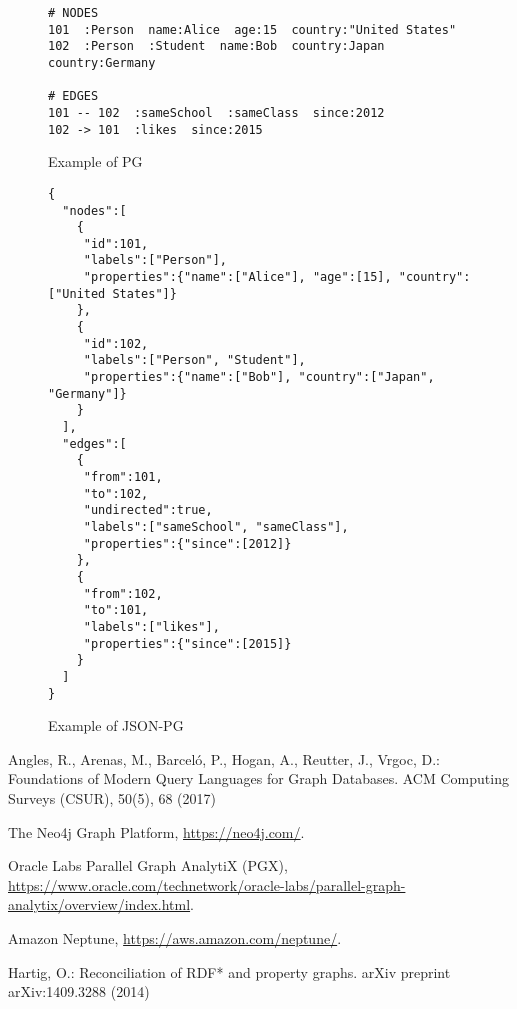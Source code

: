 \documentclass[runningheads]{llncs}
\begin{document}
\begin{figure}[!t]
\begin{scriptsize}
\begin{verbatim}
# NODES
101  :Person  name:Alice  age:15  country:"United States"
102  :Person  :Student  name:Bob  country:Japan  country:Germany

# EDGES
101 -- 102  :sameSchool  :sameClass  since:2012
102 -> 101  :likes  since:2015
\end{verbatim}
\end{scriptsize}
\caption{Example of PG}
\label{fig:example-pg}
\end{figure}

\begin{figure}[!t]
\begin{scriptsize}
\begin{verbatim}
{
  "nodes":[
    {
     "id":101,
     "labels":["Person"],
     "properties":{"name":["Alice"], "age":[15], "country":["United States"]}
    },
    {
     "id":102,
     "labels":["Person", "Student"],
     "properties":{"name":["Bob"], "country":["Japan", "Germany"]}
    }
  ],
  "edges":[
    {
     "from":101,
     "to":102,
     "undirected":true,
     "labels":["sameSchool", "sameClass"],
     "properties":{"since":[2012]}
    },
    {
     "from":102,
     "to":101,
     "labels":["likes"],
     "properties":{"since":[2015]}
    }
  ]
}
\end{verbatim}
\end{scriptsize}
\caption{Example of JSON-PG}
\label{fig:example-json}
\end{figure}



%
%
%
% 
% 
%
\begin{thebibliography}{8}

Angles, R., Arenas, M., Barceló, P., Hogan, A., Reutter, J., Vrgoc, D.: Foundations of Modern Query Languages for Graph Databases. ACM Computing Surveys (CSUR), 50(5), 68 (2017)

The Neo4j Graph Platform, \url{https://neo4j.com/}.

Oracle Labs Parallel Graph AnalytiX (PGX), \url{https://www.oracle.com/technetwork/oracle-labs/parallel-graph-analytix/overview/index.html}.

Amazon Neptune, \url{https://aws.amazon.com/neptune/}.

Hartig, O.: Reconciliation of RDF* and property graphs. arXiv preprint arXiv:1409.3288 (2014)

\end{thebibliography}
\end{document}
